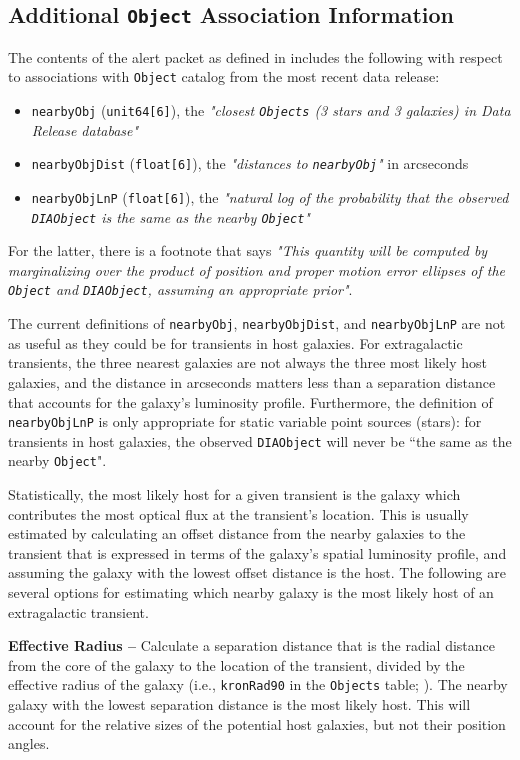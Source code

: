\documentclass[DM,lsstdraft,authoryear,toc]{lsstdoc}
\begin{document}
\subsection{Additional {\tt Object} Association Information}\label{ssec:packets_add}

The contents of the alert packet as defined in  includes the following with respect to associations with {\tt Object} catalog from the most recent data release:
\begin{itemize}
\item {\tt nearbyObj} ({\tt unit64[6]}), the {\it "closest {\tt Objects} (3 stars and 3 galaxies) in Data Release database"}
\item {\tt nearbyObjDist} ({\tt float[6]}), the {\it "distances to {\tt nearbyObj}"} in arcseconds
\item {\tt nearbyObjLnP} ({\tt float[6]}), the {\it "natural log of the probability that the observed {\tt DIAObject} is the same as the nearby {\tt Object}"}
\end{itemize}
For the latter, there is a footnote that says {\it "This quantity will be computed by marginalizing over the product of position and proper motion error ellipses of the {\tt Object} and {\tt DIAObject}, assuming an appropriate prior"}.

The current definitions of {\tt nearbyObj}, {\tt nearbyObjDist}, and {\tt nearbyObjLnP} are not as useful as they could be for transients in host galaxies. 
For extragalactic transients, the three nearest galaxies are not always the three most likely host galaxies, and the distance in arcseconds matters less than a separation distance that accounts for the galaxy's luminosity profile.
Furthermore, the definition of {\tt nearbyObjLnP} is only appropriate for static variable point sources (stars): for transients in host galaxies, the observed {\tt DIAObject} will never be ``the same as the nearby {\tt Object}".

Statistically, the most likely host for a given transient is the galaxy which contributes the most optical flux at the transient's location.
This is usually estimated by calculating an offset distance from the nearby galaxies to the transient that is expressed in terms of the galaxy's spatial luminosity profile, and assuming the galaxy with the lowest offset distance is the host.
The following are several options for estimating which nearby galaxy is the most likely host of an extragalactic transient.

{\bf Effective Radius --} Calculate a separation distance that is the radial distance from the core of the galaxy to the location of the transient, divided by the effective radius of the galaxy (i.e., {\tt kronRad90} in the {\tt Objects} table; ).
The nearby galaxy with the lowest separation distance is the most likely host. This will account for the relative sizes of the potential host galaxies, but not their position angles. 
\end{document}
